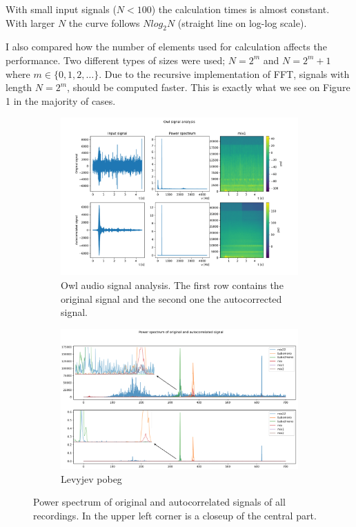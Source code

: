 \documentclass[12pt, a4paper]{article}
\begin{document}
With small input signals ($N < 100$) the calculation times is almost constant. With larger $N$ the curve follows $Nlog_2N$ (straight line on log-log scale). 

I also compared how the number of elements used for calculation affects the performance. Two different types of sizes were used; $N = 2^m$ and $N = 2^m+1$ where $m \in \{0, 1, 2, \dots\}$. Due to the recursive implementation of FFT, signals with length $N = 2^m$, should be computed faster. This is exactly what we see on Figure 1 in the majority of cases.

\begin{figure}[hbtp]
  \centering
  \begin{subfigure}{\textwidth}
    \centering
    \includegraphics[width=\linewidth]{graphs/spectrogram4.pdf}
    \caption{Owl audio signal analysis. The first row contains the original signal and the second one the autocorrected signal.}
    \label{fig:sub1}
  \end{subfigure} 
  
  \begin{subfigure}{\textwidth}
    \centering
    \includegraphics[width=\linewidth]{graphs/spectrum_zoom_photo.png}
    \caption{Levyjev pobeg}
    \label{fig:sub2}
  \end{subfigure} 
  \caption{Power spectrum of original and autocorrelated signals of all recordings. In the upper left corner is a closeup of the central part.}
  \label{fig:test}
\end{figure}
\end{document}
